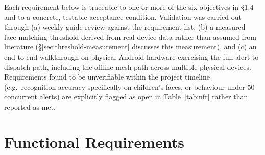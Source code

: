 \documentclass[12pt,a4paper,oneside]{report}
\begin{document}
Each requirement below is traceable to one or more of the six objectives in
\S1.4 and to a concrete, testable acceptance condition. Validation was
carried out through (a) weekly guide review against the requirement list,
(b) a measured face-matching threshold derived from real device data rather
than assumed from literature (\S\ref{sec:threshold-measurement} discusses this measurement), and (c) an
end-to-end walkthrough on physical Android hardware exercising the full
alert-to-dispatch path, including the offline-mesh path across multiple
physical devices. Requirements found to be unverifiable within the project
timeline (e.g.\ recognition accuracy specifically on children's faces, or
behaviour under 50 concurrent alerts) are explicitly flagged as open in
Table~\ref{tab:nfr} rather than reported as met.

\section{Functional Requirements}
\end{document}
